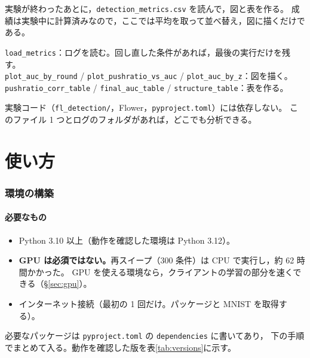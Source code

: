 \documentclass[a4j, dvipdfmx]{jsarticle}  %
\begin{document}
\begin{description}[leftmargin=1.4em, style=nextline]
  \item[役割] 実験が終わったあとに，\texttt{detection\_metrics.csv} を読んで，図と表を作る。
        成績は実験中に計算済みなので，ここでは平均を取って並べ替え，図に描くだけである。
  \item[主な関数]
        \texttt{load\_metrics}：ログを読む。回し直した条件があれば，最後の実行だけを残す。\\
        \texttt{plot\_auc\_by\_round} / \texttt{plot\_pushratio\_vs\_auc} / \texttt{plot\_auc\_by\_z}：図を描く。\\
        \texttt{pushratio\_corr\_table} / \texttt{final\_auc\_table} / \texttt{structure\_table}：表を作る。
  \item[要点] 実験コード（\texttt{fl\_detection/}，Flower，\texttt{pyproject.toml}）には依存しない。
        このファイル 1 つとログのフォルダがあれば，どこでも分析できる。
\end{description}

\part{使い方}
\label{part:usage}

\section{環境の構築}
\label{sec:setup}

\subsection{必要なもの}

\begin{itemize}
  \item Python 3.10 以上（動作を確認した環境は Python 3.12）。
  \item \textbf{GPU は必須ではない。}再スイープ（300 条件）は CPU で実行し，約 62 時間かかった。
        GPU を使える環境なら，クライアントの学習の部分を速くできる（\S\ref{sec:gpu}）。
  \item インターネット接続（最初の 1 回だけ。パッケージと MNIST を取得する）。
\end{itemize}

必要なパッケージは \texttt{pyproject.toml} の \texttt{dependencies} に書いてあり，
下の手順でまとめて入る。動作を確認した版を表\ref{tab:versions}に示す。
\end{document}
